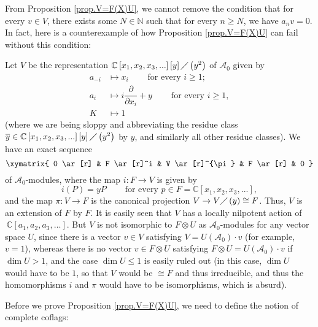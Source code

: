 \documentclass[etingof-lie.tex]{subfiles}
\begin{document}
\begin{remark}
From Proposition \ref{prop.V=F(X)U}, we cannot remove the condition that for
every $v\in V$, there exists some $N\in\mathbb{N}$ such that for every $n\geq
N$, we have $a_{n}v=0$. In fact, here is a counterexample of how Proposition
\ref{prop.V=F(X)U} can fail without this condition:

Let $V$ be the representation $\mathbb{C}\left[  x_{1},x_{2},x_{3},...\right]
\left[  y\right]  \diagup\left(  y^{2}\right)  $ of $\mathcal{A}_{0}$ given
by
\begin{align*}
a_{-i}  &  \mapsto x_{i}\ \ \ \ \ \ \ \ \ \ \text{for every }i\geq1;\\
a_{i}  &  \mapsto i\dfrac{\partial}{\partial x_{i}}%
+y\ \ \ \ \ \ \ \ \ \ \text{for every }i\geq1,\\
K  &  \mapsto1
\end{align*}
(where we are being sloppy and abbreviating the residue class $\overline{y}%
\in\mathbb{C}\left[  x_{1},x_{2},x_{3},...\right]  \left[  y\right]
\diagup\left(  y^{2}\right)  $ by $y$, and similarly all other residue
classes). We have an exact sequence%
\[%
\xymatrix{
0 \ar[r] & F \ar[r]^i & V \ar[r]^{\pi} & F \ar[r] & 0
}%
\]
of $\mathcal{A}_{0}$-modules, where the map $i:F\rightarrow V$ is given by%
\[
i\left(  P\right)  =yP\ \ \ \ \ \ \ \ \ \ \text{for every }p\in F=\mathbb{C}%
\left[  x_{1},x_{2},x_{3},...\right]  ,
\]
and the map $\pi:V\rightarrow F$ is the canonical projection $V\rightarrow
V\diagup\left(  y\right)  \cong F$. Thus, $V$ is an extension of $F$ by $F$.
It is easily seen that $V$ has a locally nilpotent action of$\ \mathbb{C}%
\left[  a_{1},a_{2},a_{3},...\right]  $. But $V$ is not isomorphic to
$F\otimes U$ as $\mathcal{A}_{0}$-modules for any vector space $U$, since
there is a vector $v\in V$ satisfying $V=U\left(  \mathcal{A}_{0}\right)
\cdot v$ (for example, $v=1$), whereas there is no vector $v\in F\otimes U$
satisfying $F\otimes U=U\left(  \mathcal{A}_{0}\right)  \cdot v$ if $\dim
U>1$, and the case $\dim U\leq1$ is easily ruled out (in this case, $\dim U$
would have to be $1$, so that $V$ would be $\cong F$ and thus irreducible, and
thus the homomorphisms $i$ and $\pi$ would have to be isomorphisms, which is absurd).
\end{remark}

Before we prove Proposition \ref{prop.V=F(X)U}, we need to define the notion
of complete coflags:
\end{document}

